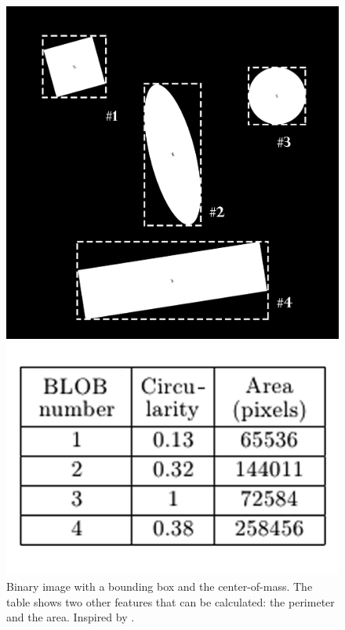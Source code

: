 \begin{figure}[ht]
\begin{minipage}[b]{0.45\linewidth}
\centering
\includegraphics[width=1\textwidth]{Pictures/Theory/binary_image.png}
\end{minipage}
\hspace{0.5cm}	
\begin{minipage}[b]{0.45\linewidth}
\centering
\includegraphics[width=1\textwidth]{Pictures/Theory/binary_image_table.png}
\end{minipage}
\label{fig:BinaryIm}
\caption{Binary image with a bounding box and the center-of-mass. The table shows two other features that can be calculated: the perimeter and the area. Inspired by \citep{ip_book}.}
\end{figure}

